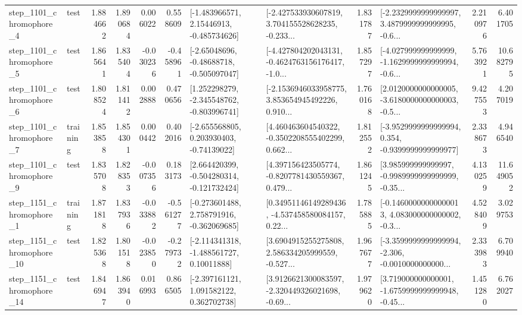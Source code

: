 \begin{tabular}{llrrrrllrlrr}
  step\_1101\_chromophore\_4 &      test &      1.884662 &    1.890684 &      0.006022 &  0.558609 &    [-1.483966571, 2.15446913, -0.485734626] &  [-2.427533930607819, 3.704155528628235, -0.233... &       1.831787 &  [-2.2329999999999997, 3.4879999999999995, -0.6... &            2.210976 &          6.401705 \\
  step\_1101\_chromophore\_5 &      test &      1.865641 &    1.835404 &     -0.030236 & -0.458961 &    [-2.65048696, -0.48688718, -0.505097047] &  [-4.427804202043131, -0.4624763156176417, -1.0... &       1.857297 &  [-4.027999999999999, -1.1629999999999994, -0.6... &            5.763921 &         10.682795 \\
  step\_1101\_chromophore\_6 &      test &      1.808524 &    1.811412 &      0.002888 &  0.470656 &   [1.252298279, -2.345548762, -0.803996741] &  [-2.1536946033958775, 3.853654945492226, 0.910... &       1.760168 &  [2.0120000000000005, -3.6180000000000003, -0.5... &            9.427553 &          4.207019 \\
  step\_1101\_chromophore\_7 &  training &      1.853858 &    1.854301 &      0.000442 &  0.402016 &    [-2.655568805, 0.203930403, -0.74139022] &  [4.460463604540322, -0.3502208555402299, 0.662... &       1.812552 &  [-3.9529999999999994, 0.354, -0.9399999999999977] &            2.338673 &          4.946540 \\
  step\_1101\_chromophore\_9 &      test &      1.835708 &    1.828353 &     -0.007356 &  0.183173 &   [2.664420399, -0.504280314, -0.121732424] &  [4.397156423505774, -0.8207781430559367, 0.479... &       1.861245 &  [3.985999999999997, -0.9989999999999999, -0.35... &            4.130259 &         11.649052 \\
  step\_1151\_chromophore\_1 &  training &      1.871818 &    1.837936 &     -0.033882 & -0.561277 &   [-0.273601488, 2.758791916, -0.362069685] &  [0.34951146149289436, -4.537458580084157, 0.22... &       1.785885 &  [-0.14600000000000013, 4.083000000000002, -0.3... &            4.528409 &          3.029753 \\
 step\_1151\_chromophore\_10 &      test &      1.825368 &    1.801518 &     -0.023850 & -0.279732 &    [-2.114341318, -1.488561727, 0.10011888] &  [3.6904915255275808, 2.586334205999559, -0.527... &       1.967677 &  [-3.3599999999999994, -2.306, -0.0010000000000... &            2.333983 &          6.709940 \\
 step\_1151\_chromophore\_14 &      test &      1.846947 &    1.863940 &      0.016993 &  0.866505 &    [-2.397161121, 1.091582122, 0.362702738] &  [3.9126621300083597, -2.320449326021698, -0.69... &       1.979620 &  [3.719000000000001, -1.6759999999999948, -0.45... &            1.451280 &          6.762027 \\

\end{tabular}
